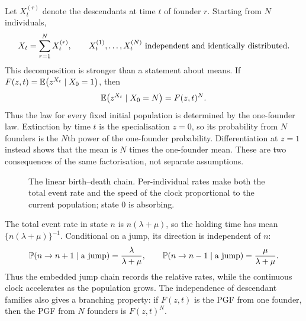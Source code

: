 Let $X_t^{(r)}$ denote the descendants at time $t$ of founder $r$.  Starting from
$N$ individuals,
\begin{equation}
  X_t=\sum_{r=1}^{N}X_t^{(r)},
  \qquad
  X_t^{(1)},\ldots,X_t^{(N)}\ \hbox{independent and identically distributed}.
  \label{m:eq:bd-family-decomposition}
\end{equation}
This decomposition is stronger than a statement about means.  If
$F(z,t)=\mathbb{E}\!\left(z^{X_t}\mid X_0=1\right)$, then
\begin{equation}
  \mathbb{E}\!\left(z^{X_t}\mid X_0=N\right)=F(z,t)^N.
  \label{m:eq:bd-branching-property}
\end{equation}
Thus the law for every fixed initial population is determined by the one-founder
law.  Extinction by time $t$ is the specialisation $z=0$, so its probability from
$N$ founders is the $N$th power of the one-founder probability.  Differentiation
at $z=1$ instead shows that the mean is $N$ times the one-founder mean.  These are
two consequences of the same factorisation, not separate assumptions.

\begin{figure}[tbp]
  \centering
  \caption{The linear birth--death chain.  Per-individual rates make both the
  total event rate and the speed of the clock proportional to the current
  population; state $0$ is absorbing.}
  \label{m:fig:birth-death-chain}
\end{figure}
The total event rate in state $n$ is $n(\lambda+\mu)$, so the holding time has
mean $\{n(\lambda+\mu)\}^{-1}$.  Conditional on a jump, its direction is
independent of $n$:
\begin{equation}
  \mathbb{P}\!\left(n\to n+1\mid\text{a jump}\right)=\frac{\lambda}{\lambda+\mu},
  \qquad
  \mathbb{P}\!\left(n\to n-1\mid\text{a jump}\right)=\frac{\mu}{\lambda+\mu}.
  \label{m:eq:bd-embedded-chain}
\end{equation}
Thus the embedded jump chain records the relative rates, while the continuous
clock accelerates as the population grows.  The independence of descendant
families also gives a branching property: if $F(z,t)$ is the PGF from one founder,
then the PGF from $N$ founders is $F(z,t)^N$.

